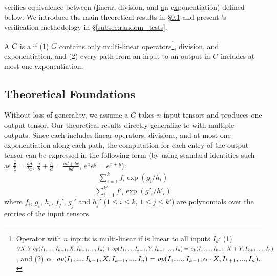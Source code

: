 %
%
\sys verifies equivalence between \lax \graphs (\underline{l}inear, division, and \underline{a}n e\underline{x}ponentiation) defined below. We introduce the main theoretical results in \S\ref{subsec:theory} and present \sys's verification methodology in \S\ref{subsec:random_tests}.

\begin{definition}[\lax \graph]
A \graph $G$ is a \lax \graph if (1) $G$ contains only multi-linear operators\footnote{Operator  with $n$ inputs is multi-linear if  is linear to all inputs $I_k$: \newline (1) $\forall X, Y. \mbox{\rm\em op}(I_1,...,I_{k-1},X,I_{k+1},...,I_n)+\mbox{\rm\em op}(I_1,...,I_{k-1},Y,I_{k+1},...,I_n)=\mbox{\rm\em op}(I_1,...,I_{k-1},X+Y,I_{k+1},...,I_n)$, and \newline(2) $\alpha \cdot \mbox{\rm\em op}(I_1,...,I_{k-1},X,I_{k+1},...,I_n) = \mbox{\rm\em op}(I_1,...,I_{k-1},\alpha\cdot X,I_{k+1},...,I_n).$}, division, and exponentiation, and (2) every path from an input to an output in $G$ includes at most one exponentiation.
\end{definition}
%


\subsection{Theoretical Foundations}
\label{subsec:theory}
Without loss of generality, we assume a \lax \graph $G$ takes $n$ input tensors and produces one output tensor.
Our theoretical results directly generalize to \lax \graph with multiple outputs.
%
Since each \lax \graph includes linear operators, divisions, and at most one exponentiation along each path,
%
the computation for each entry of the output tensor can be expressed in the following form (by using standard identities such as $\frac{\frac{a}{b}}{\frac{c}{d}} = \frac{ad}{bc}$, $\frac{a}{b} + \frac{c}{d} = \frac{ad+bc}{bd}$, $e^{x}e^{y}=e^{x+y}$):
%
\begin{equation}
\label{eq:lax}
\frac{\sum_{i=1}^k f_i \exp(g_i/h_i)}{\sum_{i=1}^{k'} f'_i \exp(g'_i/h'_i)}
\end{equation}
where $f_i$, $g_i$, $h_i$, $f_j'$, $g_j'$ and $h_j'$ ($1\leq i \leq k$, $1 \leq j \leq k'$) are polynomials over the entries of the input tensors.

